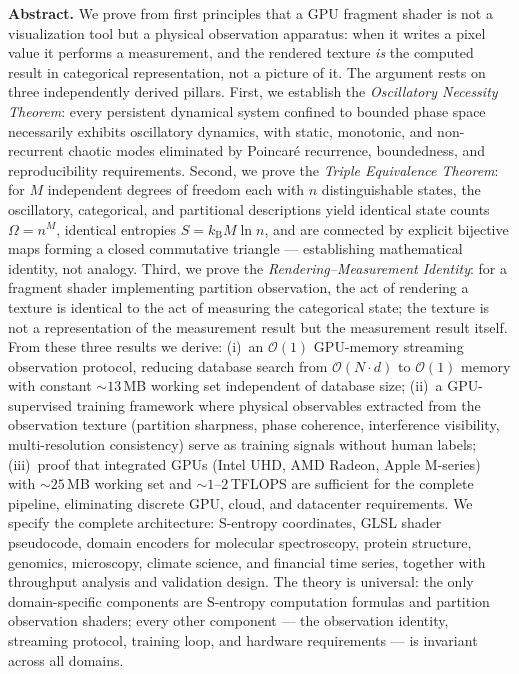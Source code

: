 \documentclass[11pt,twocolumn,a4paper]{article}
\newcommand{\kb}{k_{\mathrm{B}}}
\newcommand{\BigO}{\mathcal{O}}
\begin{document}
\begin{@twocolumnfalse}
\begin{center}
\begin{minipage}{0.92\textwidth}
\textbf{Abstract.}
We prove from first principles that a GPU fragment shader is not a
visualization tool but a physical observation apparatus: when it writes a
pixel value it performs a measurement, and the rendered texture \emph{is}
the computed result in categorical representation, not a picture of it.
The argument rests on three independently derived pillars. First, we
establish the \emph{Oscillatory Necessity Theorem}: every persistent
dynamical system confined to bounded phase space necessarily exhibits
oscillatory dynamics, with static, monotonic, and non-recurrent chaotic
modes eliminated by Poincar\'{e} recurrence, boundedness, and
reproducibility requirements. Second, we prove the \emph{Triple
Equivalence Theorem}: for $M$ independent degrees of freedom each with
$n$ distinguishable states, the oscillatory, categorical, and
partitional descriptions yield identical state counts $\Omega = n^{M}$,
identical entropies $S = \kb M \ln n$, and are connected by explicit
bijective maps forming a closed commutative triangle --- establishing
mathematical identity, not analogy. Third, we prove the
\emph{Rendering--Measurement Identity}: for a fragment shader
implementing partition observation, the act of rendering a texture is
identical to the act of measuring the categorical state; the texture is
not a representation of the measurement result but the measurement
result itself. From these three results we derive: (i)~an $\BigO(1)$
GPU-memory streaming observation protocol, reducing database search from
$\BigO(N \cdot d)$ to $\BigO(1)$ memory with constant $\sim\!13$\,MB
working set independent of database size; (ii)~a GPU-supervised training
framework where physical observables extracted from the observation
texture (partition sharpness, phase coherence, interference visibility,
multi-resolution consistency) serve as training signals without human
labels; (iii)~proof that integrated GPUs (Intel UHD, AMD Radeon, Apple
M-series) with $\sim\!25$\,MB working set and $\sim\!1$--$2$\,TFLOPS
are sufficient for the complete pipeline, eliminating discrete GPU,
cloud, and datacenter requirements. We specify the complete
architecture: S-entropy coordinates, GLSL shader pseudocode, domain
encoders for molecular spectroscopy, protein structure, genomics,
microscopy, climate science, and financial time series, together with
throughput analysis and validation design. The theory is universal:
the only domain-specific components are S-entropy computation formulas
and partition observation shaders; every other component ---
the observation identity, streaming protocol, training loop, and
hardware requirements --- is invariant across all domains.


\end{minipage}
\end{center}
\end{@twocolumnfalse}
\end{document}
